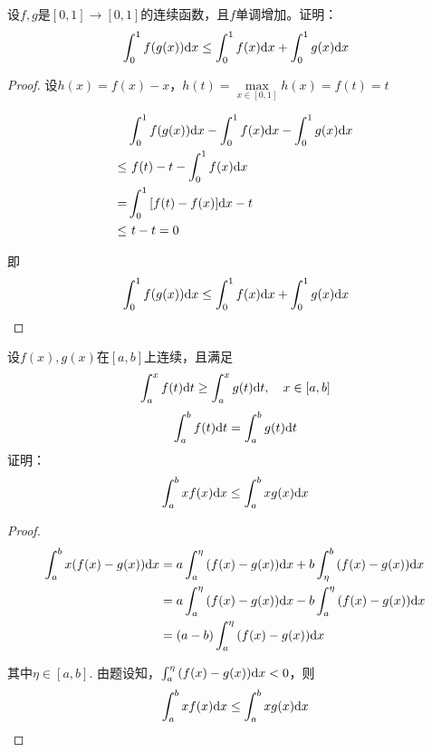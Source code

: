 \begin{proposition}

    设$f, g$是$[0, 1] \to [0, 1]$的连续函数，且$f$单调增加。证明：
    \[\int_{0}^{1}{f(g(x))}\mathrm{d} x \leq \int_{0}^{1}{f(x)}\mathrm{d} x + \int_{0}^{1}{g(x)}\mathrm{d} x\]

\end{proposition}

\begin{proof}

    设$h(x) = f(x) - x$，$h(t) = \max\limits_{x \in [0, 1]}{h(x)} = f(t) = t$

    \begin{align*}
        & \int_{0}^{1}{f(g(x))}\mathrm{d} x - \int_{0}^{1}{f(x)}\mathrm{d} x - \int_{0}^{1}{g(x)}\mathrm{d} x \\
        \leq & \ f(t) - t - \int_{0}^{1}{f(x)}\mathrm{d} x \\
        = & \int_{0}^{1}{[f(t) - f(x)]}\mathrm{d} x - t \\
        \leq & \ t - t = 0
    \end{align*}

    即
    \[\int_{0}^{1}{f(g(x))}\mathrm{d} x \leq \int_{0}^{1}{f(x)}\mathrm{d} x + \int_{0}^{1}{g(x)}\mathrm{d} x\]

\end{proof}

\begin{proposition}

    设$f(x), g(x)$在$[a, b]$上连续，且满足
    \[\int_{a}^{x}{f(t)}\mathrm{d} t \geq \int_{a}^{x}{g(t)}\mathrm{d} t, \quad x \in [a, b]\]
    \[\int_{a}^{b}{f(t)}\mathrm{d} t = \int_{a}^{b}{g(t)}\mathrm{d} t\]
    证明：
    \[\int_{a}^{b}{xf(x)}\mathrm{d} x \leq \int_{a}^{b}{xg(x)}\mathrm{d} x\]

\end{proposition}

\begin{proof}

    \begin{align*}
        \int_{a}^{b}{x(f(x) - g(x))}\mathrm{d} x & = a \int_{a}^{\eta}{(f(x) - g(x))}\mathrm{d} x + b\int_{\eta}^{b}{(f(x) - g(x))}\mathrm{d} x \\
        & = a \int_{a}^{\eta}{(f(x) - g(x))}\mathrm{d} x - b\int_{a}^{\eta}{(f(x) - g(x))}\mathrm{d} x \\
        & = (a - b) \int_{a}^{\eta}{(f(x) - g(x))}\mathrm{d} x
    \end{align*}

    其中$\eta \in [a, b]$. 由题设知，$\int_{a}^{\eta}{(f(x) - g(x))}\mathrm{d} x < 0$，则
    \[\int_{a}^{b}{xf(x)}\mathrm{d} x \leq \int_{a}^{b}{xg(x)}\mathrm{d} x\]

\end{proof}

